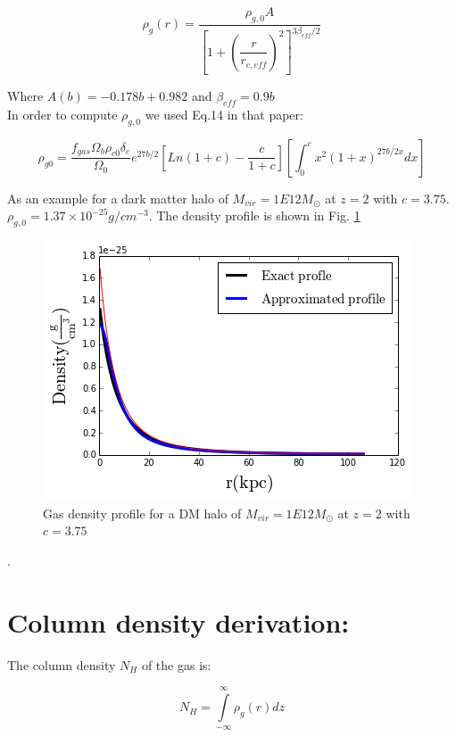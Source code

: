 \documentclass[12pt]{article}
\begin{document}
\begin{equation}\label{eq:rhogr}
\rho_g(r) =  \dfrac{\rho_{g,0}A}{\left[ 1 + \left(\dfrac{r}{r_{c,eff}}\right)^2 \right]^{3\beta_{eff}/2}}
\end{equation}

Where $A(b) = -0.178b + 0.982$ and $\beta_{eff} = 0.9 b$\\

In order to compute $\rho_{g,0}$ we used Eq.14 in that paper:

\begin{equation}\label{eq:rhog0}
\rho_{g0} = \dfrac{f_{gas}\Omega_{b}\rho_{c0}\delta_{c}}{\Omega_0}e^{27b/2} \left [ Ln(1+c) - \dfrac{c}{1+c}  \right ] \left [ \int_0^c x^2(1+x)^{27b/2x} dx \right ]
\end{equation}

As an example for a dark matter halo of $M_{vir} = 1E12 M_{\odot}$ at
$z=2$ with $c=3.75$. $\rho_{g,0}=1.37\times10^{-25} g/cm^{-3}$. The
density profile is shown in Fig. \ref{fig:gp}

\begin{figure}
\centering
\includegraphics[scale=0.7]{../figures/gasprofile.png}
\caption{Gas density profile for a DM halo of $M_{vir} = 1E12
M_{\odot}$ at $z=2$ with $c=3.75$ \label{fig:gp}}
\end{figure}.


\section{Column density derivation:}\label{sec:NH}

The column density $N_{H}$ of the gas is:

\begin{equation}
N_{H} = \int \limits_{-\infty}^{\infty}\rho_g(r)dz
\end{equation}
\end{document}
